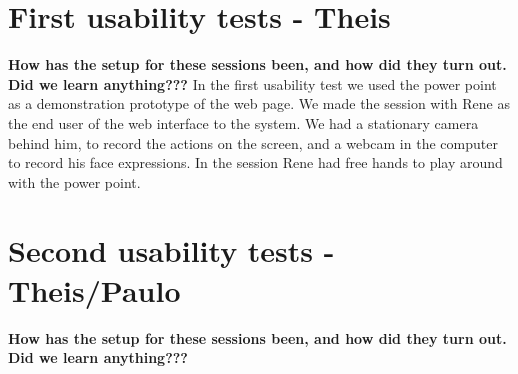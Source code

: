 \section{First usability tests - Theis}
\textbf{How has the setup for these sessions been, and how did they turn out. Did we learn anything???}
In the first usability test we used the power point as a demonstration prototype of the web page. We made the session with Rene as the end user of the web interface to the system. We had a stationary camera behind him, to record the actions on the screen, and a webcam in the computer to record his face expressions. In the session Rene had free hands to play around with the power point.


\section{Second usability tests - Theis/Paulo}
\textbf{How has the setup for these sessions been, and how did they turn out. Did we learn anything???}


